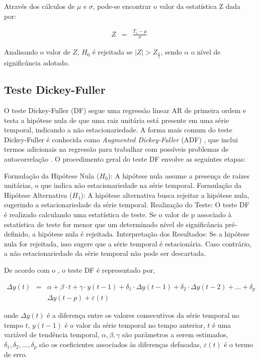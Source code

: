 Através dos cálculos de $\mu$ e $\sigma$, pode-se encontrar o valor da estatística $\mathrm{Z}$ dada por:

\begin{eqnarray}
	Z&=&\frac{T_1-\mu}{\sigma}
\end{eqnarray}


Analisando o valor de $Z$, $H_0$ é rejeitada se $|Z|>Z_{\frac{a}{2}}$, sendo $\alpha$ o nível de significância adotado.



\subsection{Teste Dickey-Fuller}

O teste Dickey-Fuller (DF) segue uma regressão linear AR de primeira ordem e testa a hipótese nula de que uma raiz unitária está presente em uma série temporal, indicando a não estacionariedade. A forma mais comum do teste Dickey-Fuller é conhecida como \textit{Augmented Dickey-Fuller} (ADF) , que inclui termos adicionais na regressão para trabalhar com possíveis problemas de autocorrelação
 \cite{Agiakloglou}. O procedimento geral do teste DF envolve as seguintes etapas:

Formulação da Hipótese Nula ($H_0$): A hipótese nula assume a presença de raízes unitárias, o que indica não estacionariedade na série temporal.
Formulação da Hipótese Alternativa ($H_1$): A hipótese alternativa busca rejeitar a hipótese nula, sugerindo a estacionariedade da série temporal.
Realização do Teste: O teste DF é realizado calculando uma estatística de teste. Se o valor de p associado à estatística de teste for menor que um determinado nível de significância pré-definido, a hipótese nula é rejeitada.
Interpretação dos Resultados: Se a hipótese nula for rejeitada, isso sugere que a série temporal é estacionária. Caso contrário, a não estacionariedade da série temporal não pode ser descartada.

De acordo com o , o teste DF é representado por,



\begin{eqnarray}
	 \Delta y(t)&=&\alpha+\beta \cdot t+\gamma \cdot y(t-1)+\delta_1 \cdot \Delta y(t-1)+\delta_2 \cdot \Delta y(t-2)+\ldots+\delta_p \nonumber\\ 
	&&\Delta y(t-p)+\varepsilon(t)
\end{eqnarray}

\noindent onde $\Delta y(t)$ é a diferença entre os valores consecutivos da série temporal no tempo $t$, $y(t-1)$ é o valor da série temporal no tempo anterior, $t$ é uma variável de tendência temporal, $\alpha, \beta, \gamma$ são parâmetros a serem estimados, $\delta_1, \delta_2, \ldots, \delta_p$ são os coeficientes associados às diferenças defasadas, $\varepsilon(t)$ é o termo de erro.
 
